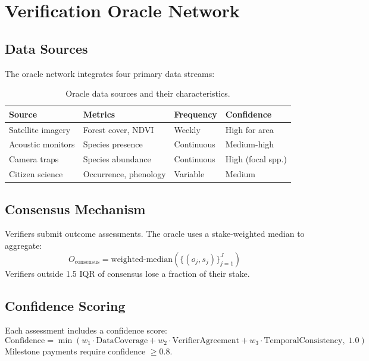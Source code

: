 \documentclass[11pt,a4paper]{article}
\begin{document}
\section{Verification Oracle Network}
\label{sec:oracle}

\subsection{Data Sources}

The oracle network integrates four primary data streams:

\begin{table}[H]
\centering
\caption{Oracle data sources and their characteristics.}
\label{tab:oracle_sources}
\begin{tabular}{p{2.5cm}p{3cm}p{2cm}p{3cm}}
\toprule
\textbf{Source} & \textbf{Metrics} & \textbf{Frequency} &
  \textbf{Confidence} \\
\midrule
Satellite imagery & Forest cover, NDVI & Weekly & High for area \\
Acoustic monitors & Species presence & Continuous & Medium-high \\
Camera traps & Species abundance & Continuous & High (focal spp.) \\
Citizen science & Occurrence, phenology & Variable & Medium \\
\bottomrule
\end{tabular}
\end{table}

\subsection{Consensus Mechanism}

Verifiers submit outcome assessments. The oracle uses a stake-weighted
median to aggregate:
\begin{equation}
  O_{\text{consensus}} = \text{weighted-median}\!\left(
    \{(o_j, s_j)\}_{j=1}^{J}\right)
\end{equation}
Verifiers outside 1.5 IQR of consensus lose a fraction of their stake.

\subsection{Confidence Scoring}

Each assessment includes a confidence score:
\begin{equation}
  \text{Confidence} = \min\!\left(
    w_1 \cdot \text{DataCoverage} +
    w_2 \cdot \text{VerifierAgreement} +
    w_3 \cdot \text{TemporalConsistency},\; 1.0
  \right)
\end{equation}
Milestone payments require confidence $\geq 0.8$.
\end{document}
